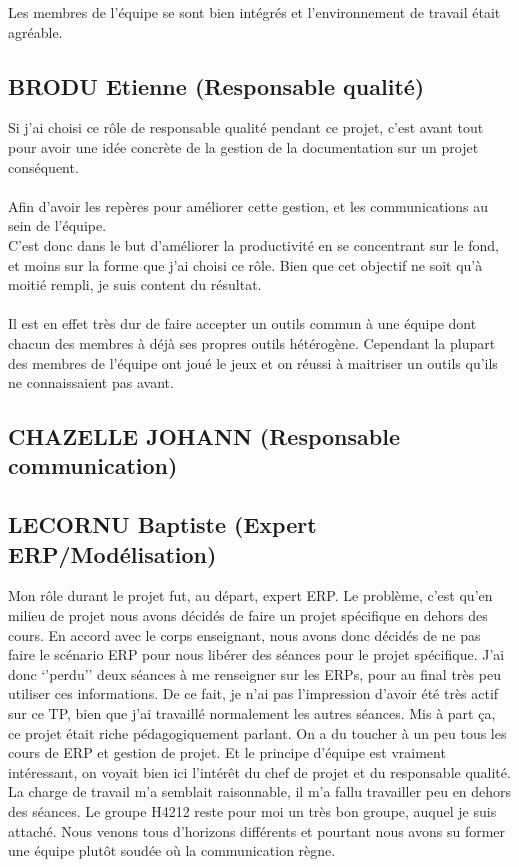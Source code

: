 Les membres de l'équipe se sont bien intégrés et l'environnement de travail était agréable.

       \subsection{BRODU Etienne (Responsable qualité)}

Si j'ai choisi ce rôle de responsable qualité pendant ce projet, c'est avant tout pour avoir une idée concrète de la gestion de la documentation sur un projet conséquent.\\
\\
Afin d'avoir les repères pour améliorer cette gestion, et les communications au sein de l'équipe.\\
C'est donc dans le but d'améliorer la productivité en se concentrant sur le fond, et moins sur la forme que j'ai choisi ce rôle.
Bien que cet objectif ne soit qu'à moitié rempli, je suis content du résultat.\\
\\
Il est en effet très dur de faire accepter un outils commun à une équipe dont chacun des membres à déjà ses propres outils hétérogène.
Cependant la plupart des membres de l'équipe ont joué le jeux et on réussi à maitriser un outils qu'ils ne connaissaient pas avant.

       \subsection{CHAZELLE JOHANN (Responsable communication)}

       \subsection{LECORNU Baptiste (Expert ERP/Modélisation)}
Mon rôle durant le projet fut, au départ, expert ERP. Le problème, c’est qu’en milieu de projet nous avons décidés de faire un projet spécifique en dehors des cours. En accord avec le corps enseignant, nous avons donc décidés de ne pas faire le scénario ERP pour nous libérer des séances pour le projet spécifique. J’ai donc ‘’perdu’’ deux séances à me renseigner sur les ERPs, pour au final très peu utiliser ces informations. De ce fait, je n’ai pas l’impression d’avoir été très actif sur ce TP, bien que j’ai travaillé normalement les autres séances. 
Mis à part ça, ce projet était riche pédagogiquement parlant. On a du toucher à un peu tous les cours de ERP et gestion de projet. Et le principe d’équipe est vraiment intéressant, on voyait bien ici l’intérêt du chef de projet et du responsable qualité.
La charge de travail m’a semblait raisonnable, il m’a fallu travailler peu en dehors des séances.
 Le groupe H4212 reste pour moi un très bon groupe, auquel je suis attaché. Nous venons tous d’horizons différents et pourtant nous avons su former une équipe plutôt soudée où la communication règne.

